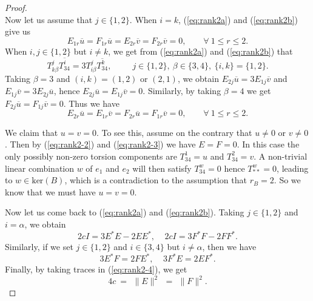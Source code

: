 \documentclass{amsart}
\begin{document}
\begin{proof}
\begin{equation}
\end{equation}
Now let us assume that $j\in \{ 1,2\}$. When $i=k$, (\ref{eq:rank2a}) and (\ref{eq:rank2b}) give us
\begin{equation}  \label{eq:rank2-2}
 E_{1r} \overline{u} = F_{1r} \overline{u} = E_{2r} \overline{v} = F_{2r} \overline{v} = 0, \ \ \ \ \ \ \ \ \ \forall \ 1\leq r\leq 2.
\end{equation}
When $i,j \in \{ 1,2\}$ but $i\neq k$, we get from (\ref{eq:rank2a}) and (\ref{eq:rank2b}) that
$$  T^j_{k\beta} \overline{T^i_{34}} = 3  T^j_{i\beta} \overline{T^k_{34}}, \ \ \ \ \ \ \ \ \ \ \ j\in \{ 1,2\}, \ \beta \in \{ 3,4\}, \ \{i,k\} =\{ 1,2\}.$$
Taking $\beta=3$ and $(i,k)=(1,2)$ or $(2,1)$, we obtain $E_{2j}\overline{u}= 3E_{1j}\overline{v}$ and $E_{1j}\overline{v}= 3E_{2j}\overline{u}$, hence $E_{2j}\overline{u}= E_{1j}\overline{v}=0$. Similarly, by taking $\beta =4$ we get $F_{2j}\overline{u}= F_{1j}\overline{v}=0$. Thus we have
\begin{equation}  \label{eq:rank2-3}
 E_{2r} \overline{u} = E_{1r} \overline{v}=F_{2r} \overline{u} = F_{1r} \overline{v}=0, \ \ \ \ \ \ \ \ \ \forall \ 1\leq r\leq 2.
\end{equation}

We claim that $u=v=0$. To see this, assume on the contrary that $u\neq 0$ or $v\neq 0$. Then by (\ref{eq:rank2-2}) and (\ref{eq:rank2-3}) we have $E=F=0$. In this case the only possibly non-zero torsion components are $T^1_{34}=u$ and $T^2_{34}=v$. A non-trivial linear combination $w$ of $e_1$ and $e_2$ will then satisfy $T^w_{34}=0$ hence $T^w_{\ast \ast }=0$,  leading to $w\in \mbox{ker}(B)$, which is a contradiction to the assumption that $r_B=2$. So we know that we must have $u=v=0$.

Now let us come back to (\ref{eq:rank2a}) and (\ref{eq:rank2b}). Taking $j\in\{1,2\}$ and $i=\alpha$, we obtain
\begin{equation}  \label{eq:rank2-4}
 2cI = 3 E^{\ast}E - 2 E E^{\ast}, \ \ \ \ \ 2cI = 3 F^{\ast}F - 2 F F^{\ast} .
\end{equation}
Similarly, if we set $j\in \{ 1,2\}$ and $i\in \{ 3,4\}$ but $i\neq \alpha$, then we have
\begin{equation}  \label{eq:rank2-5}
  3 E^{\ast}F = 2 F E^{\ast}, \ \ \ \ \ 3 F^{\ast}E = 2 E F^{\ast} .
\end{equation}
Finally, by taking traces in (\ref{eq:rank2-4}), we get
\begin{equation}  \label{eq:rank2tr}
 4c \ = \, \ \parallel\! E\! \parallel^2 \ \, = \, \ \parallel\! F\! \parallel^2 .
\end{equation}


\end{proof}
\end{document}
